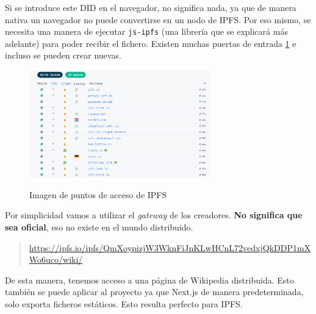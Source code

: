 Si se introduce este DID en el navegador, no significa nada, ya que de manera nativa un navegador no puede convertirse en un nodo de IPFS. Por eso mismo, se necesita una manera de ejecutar \verb|js-ipfs| (una librería que se explicará más adelante) para poder recibir el fichero.
Existen muchas puertas de entrada \ref{fg:ipfs_entry} e incluso se pueden crear nuevas.
\begin{figure}[H]
    \centering
    \includegraphics[width=0.7\textwidth]{Figures/ipfs_entry.png}
    \caption{Imagen de puntos de acceso de IPFS}
    \cite{web:gateways}
    \label{fg:ipfs_entry}
\end{figure}
Por simplicidad vamos a utilizar el \textit{gateway} de los creadores. \textbf{No significa que sea oficial}, eso no existe en el mundo distribuido.
\begin{quote}
    \url{https://ipfs.io/ipfs/QmXoypizjW3WknFiJnKLwHCnL72vedxjQkDDP1mXWo6uco/wiki/}
\end{quote}
De esta manera, tenemos acceso a una página de Wikipedia distribuida.
Esto también se puede aplicar al proyecto ya que Next.js de manera predeterminada, solo exporta ficheros estáticos. Esto resulta perfecto para IPFS.
